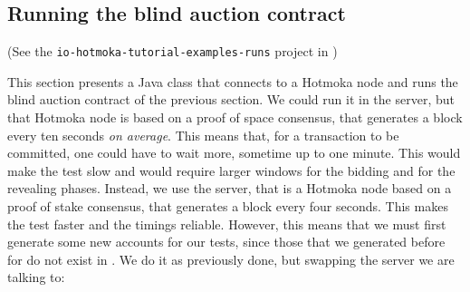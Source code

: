 \subsection{Running the blind auction contract}\label{subsec:running_blind_auction}

\begin{center}
(See the \texttt{io-hotmoka-tutorial-examples-runs} project in \hotmokaRepo{})
\end{center}

This section presents a Java class that connects to a Hotmoka node and runs the blind auction
contract of the previous section. We could run it in the \serverMokamint{} server,
but that Hotmoka node is based on a proof of space consensus, that generates a block every ten
seconds \emph{on average}. This means that, for a transaction to be committed, one could have to wait
more, sometime up to one minute. This would make the test slow and would require larger windows
for the bidding and for the revealing phases. Instead, we use the \serverTendermint{} server,
that is a Hotmoka node based on a proof of stake consensus, that generates a block every four seconds.
This makes the test faster and the timings reliable. However, this means that we must first generate
some new accounts for our tests, since those that we generated before for
\serverMokamint{} do not exist in \serverTendermint{}. We do it as previously done,
but swapping the server we are talking to:
%
%
%
%
%
%

